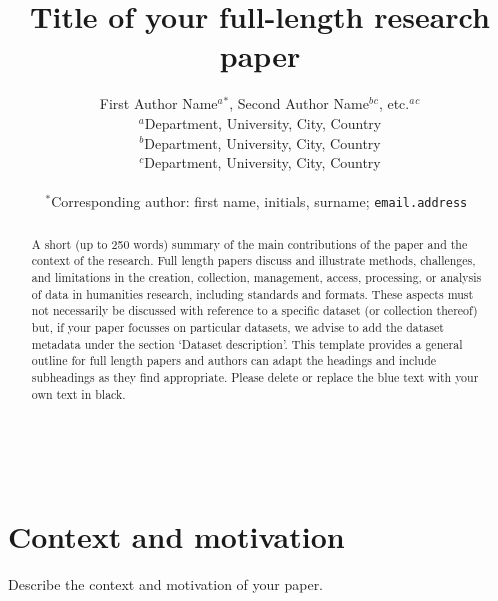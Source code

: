 \documentclass{article}
\begin{document}
\title{Title of your full-length research paper}


\author{First Author Name$^{a}$$^{*}$, Second Author Name$^{b}$$^{c}$, etc.$^{a}$$^{c}$ \\
        \small $^{a}$Department, University, City, Country \\
        \small $^{b}$Department, University, City, Country \\
        \small $^{c}$Department, University, City, Country \\\\
        \small $^{*}$Corresponding author: first name, initials, surname; \tt{email.address}
}

\date{} %



\maketitle

\begin{abstract} 
\noindent A short (up to 250 words) summary of the main contributions of the paper and the context of the research. Full length papers discuss and illustrate methods, challenges, and limitations in the creation, collection, management, access, processing, or analysis of data in humanities research, including standards and formats. These aspects must not necessarily be discussed with reference to a specific dataset (or collection thereof) but, if your paper focusses on particular datasets, we advise to add the dataset metadata under the section ‘Dataset description’. This template provides a general outline for full length papers and authors can adapt the headings and include subheadings as they find appropriate. Please delete or replace the blue text with your own text in black.  \end{abstract}

\noindent{}\\

\noindent{} 

\section{Context and motivation}

Describe the context and motivation of your paper.
\end{document}
